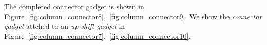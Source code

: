 The completed connector gadget is shown in Figure~\ref{fig:column_connector8},~\ref{fig:column_connector9}.
We show the \emph{connector gadget} attched to an \emph{up-shift gadget} in Figure~\ref{fig:column_connector7},~\ref{fig:column_connector10}.




